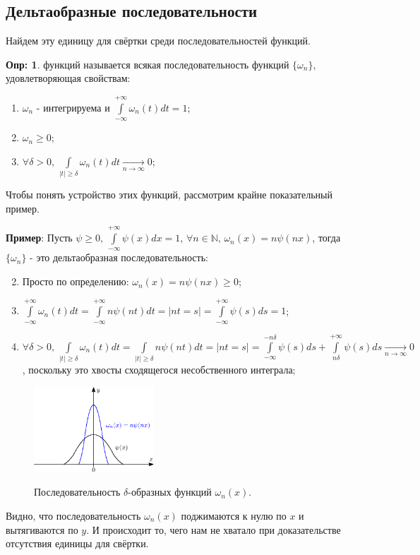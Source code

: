 \documentclass[12pt]{article}
\newcommand{\MN}{\mathbb{N}}
\theoremstyle{definition}
\newtheorem{defn}{Опр:}
\newcommand{\ddint}[2]{\displaystyle\int\limits_{#1}^{#2}}
\begin{document}
\subsection*{Дельтаобразные последовательности}
Найдем эту единицу для свёртки среди последовательностей функций.

\begin{defn}
	 функций называется всякая последовательность функций $\{\omega_n\}$, удовлетворяющая свойствам:
	\begin{enumerate}[label=\arabic*)]
		\item $\omega_n$ - интегрируема и $\ddint{-\infty}{+\infty}\omega_n(t)dt = 1$;
		\item $\omega_n \geq 0$;
		\item $\forall \delta > 0, \, \ddint{|t|\geq \delta}{}\omega_n(t)dt \xrightarrow[n \to \infty]{} 0$;
	\end{enumerate}
\end{defn}

Чтобы понять устройство этих функций, рассмотрим крайне показательный пример.

\textbf{Пример}: Пусть $\psi \geq 0, \, \ddint{-\infty}{+\infty}\psi(x)dx = 1, \, \forall n \in \MN, \, \omega_n(x) = n\psi(nx)$, тогда $\{\omega_n\}$ - это дельтаобразная последовательность:
\begin{enumerate}[label=\arabic*)]
	\setcounter{enumi}{1}
	\item Просто по определению: $\omega_n(x) = n\psi(nx) \geq 0$;
	\setcounter{enumi}{0}
	\item $\ddint{-\infty}{+\infty}\omega_n(t)dt = \ddint{-\infty}{+\infty}n\psi(nt)dt = |nt = s| = \ddint{-\infty}{+\infty}\psi(s)ds = 1$;
	\setcounter{enumi}{2}
	\item $\forall \delta > 0, \, \ddint{|t|\geq \delta}{}\omega_n(t)dt = \ddint{|t|\geq \delta}{}n\psi(nt)dt =|nt =s| = \ddint{-\infty}{-n\delta}\psi(s)ds + \ddint{n\delta}{+\infty}\psi(s)ds \xrightarrow[n \to \infty]{} 0$, поскольку это хвосты сходящегося несобственного интеграла;
\end{enumerate}
\begin{figure}[H]
	\centering
	\includegraphics[width=0.4\textwidth]{MA3L25_6.eps}
	\label{MA3L25_6}
	\caption{Последовательность $\delta$-образных функций $\omega_n(x)$.}
	\label{fig: Последовательность дельтаобразных.}
\end{figure}
Видно, что последовательность $\omega_n(x)$ поджимаются к нулю по $x$ и вытягиваются по $y$. И происходит то, чего нам не хватало при доказательстве отсутствия единицы для свёртки.
\end{document}
